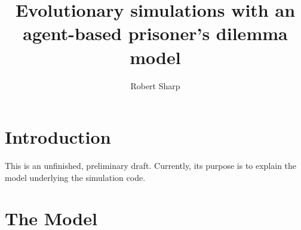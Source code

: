 \documentclass[12pt,reqno]{amsart}
\begin{document}
\title{Evolutionary simulations with an agent-based prisoner's dilemma model}

\author{Robert Sharp}
\address{2011 Monument Ave Apt 3 $\,\,\cdot\,\,$ Richmond, VA $\,\,\cdot\,\,$ 23220}



\maketitle

\section{Introduction}

This is an unfinished, preliminary draft. Currently, its purpose is to explain the model underlying the simulation code.






\section{The Model}
\end{document}
